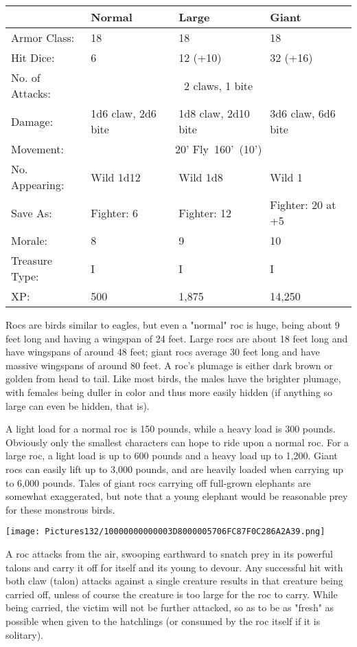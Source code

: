 \documentclass[a4paper,twoside,openany,10pt]{book}
\begin{document}
\begin{multicols}{2}
\begin{tabularx}{0.50\textwidth}{@{}lXXX@{}}
& Normal & Large & Giant \\\hline
Armor Class: & 18 & 18 & 18 \\\hline
Hit Dice: & 6 & 12 (+10) & 32 (+16) \\\hline
No. of Attacks: &\multicolumn{3}{c}{2 claws, 1 bite} \\\hline
Damage: & 1d6 claw, 2d6 bite & 1d8 claw, 2d10 bite & 3d6 claw, 6d6 bite \\\hline
Movement: & \multicolumn{3}{c}{20' Fly~160'~(10')} \\\hline
No. Appearing: & Wild 1d12 & Wild 1d8 & Wild 1 \\\hline
Save As: & Fighter: 6 & Fighter: 12 & Fighter: 20 at +5 \\\hline
Morale: & 8 & 9 & 10 \\\hline
Treasure Type: & I & I & I \\\hline
XP: & 500 & 1,875 & 14,250 \\\hline
\end{tabularx}\medskip

Rocs are birds similar to eagles, but even a "normal" roc is huge, being about 9 feet long and having a wingspan of 24 feet. Large rocs are about 18 feet long and have wingspans of around 48 feet; giant rocs average 30 feet long and have massive wingspans of around 80 feet. A roc's plumage is either dark brown or golden from head to tail. Like most birds, the males have the brighter plumage, with females being duller in color and thus more easily hidden (if anything so large can even be hidden, that is).

A light load for a normal roc is 150 pounds, while a heavy load is 300 pounds. Obviously only the smallest characters can hope to ride upon a normal roc. For a large roc, a light load is up to 600 pounds and a heavy load up to 1,200.  Giant rocs can easily lift up to 3,000 pounds, and are heavily loaded when carrying up to 6,000 pounds. Tales of giant rocs carrying off full-grown elephants are somewhat exaggerated, but note that a young elephant would be reasonable prey for these monstrous birds. 


\begin{center} \texttt{[image: Pictures132/10000000000003D8000005706FC87F0C286A2A39.png]} \end{center}

A roc attacks from the air, swooping earthward to snatch prey in its powerful talons and carry it off for itself and its young to devour. Any successful hit with both claw (talon) attacks against a single creature results in that creature being carried off, unless of course the creature is too large for the roc to carry. While being carried, the victim will not be further attacked, so as to be as "fresh" as possible when given to the hatchlings (or consumed by the roc itself if it is solitary).


\end{multicols}
\end{document}
